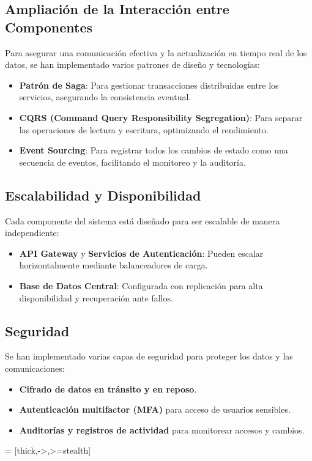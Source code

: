 \documentclass{article}
\begin{document}
\subsection{Ampliación de la Interacción entre Componentes}

Para asegurar una comunicación efectiva y la actualización en tiempo real de los datos, se han implementado varios patrones de diseño y tecnologías:
\begin{itemize}
    \item \textbf{Patrón de Saga}: Para gestionar transacciones distribuidas entre los servicios, asegurando la consistencia eventual.
    \item \textbf{CQRS (Command Query Responsibility Segregation)}: Para separar las operaciones de lectura y escritura, optimizando el rendimiento.
    \item \textbf{Event Sourcing}: Para registrar todos los cambios de estado como una secuencia de eventos, facilitando el monitoreo y la auditoría.
\end{itemize}

\subsection{Escalabilidad y Disponibilidad}

Cada componente del sistema está diseñado para ser escalable de manera independiente:
\begin{itemize}
    \item \textbf{API Gateway} y \textbf{Servicios de Autenticación}: Pueden escalar horizontalmente mediante balanceadores de carga.
    \item \textbf{Base de Datos Central}: Configurada con replicación para alta disponibilidad y recuperación ante fallos.
\end{itemize}

\subsection{Seguridad}

Se han implementado varias capas de seguridad para proteger los datos y las comunicaciones:
\begin{itemize}
    \item \textbf{Cifrado de datos en tránsito y en reposo}.
    \item \textbf{Autenticación multifactor (MFA)} para acceso de usuarios sensibles.
    \item \textbf{Auditorías y registros de actividad} para monitorear accesos y cambios.
\end{itemize}


\usetikzlibrary{shapes.geometric, arrows}

 = [thick,->,>=stealth]
\end{document}

